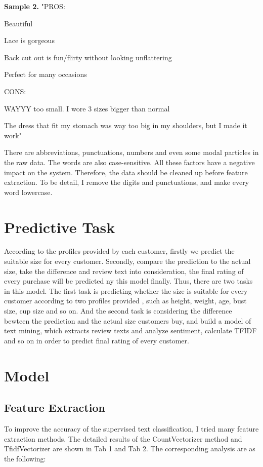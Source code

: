 \documentclass[letterpaper, 10 pt, conference]{ieeeconf}  %
\begin{document}
\textbf{Sample 2.} "PROS: 

Beautiful

Lace is gorgeous

Back cut out is fun/flirty without looking unflattering

Perfect for many occasions


CONS: 

WAYYY too small. I wore 3 sizes bigger than normal

The dress that fit my stomach was way too big in my shoulders, but I made it work"



There are abbreviations, punctuations, numbers and even some modal particles in the raw data. The words are also case-sensitive. All these factors have a negative impact on the system. Therefore, the data should be cleaned up before feature extraction. To be detail, I remove the digits and punctuations, and make every word lowercase.



\section{Predictive Task}
According to the profiles provided by each customer, firstly we predict the suitable size for every customer. Secondly, compare the prediction to the actual size, take the difference and review text into consideration, the final rating of every purchase will be predicted ny this model finally.
Thus, there are two tasks in this model. The first task is predicting whether the size is suitable for every customer according to two profiles provided , such as height, weight, age, bust size, cup size and so on. And the second task is considering the difference bewteen the prediction and the actual size customers buy,
 and build a model of text mining, which extracts review texts and analyze sentiment, calculate TFIDF and so on in order to predict final rating of every customer.


\section{Model}
\subsection{Feature Extraction}
To improve the accuracy of the supervised text classification, I tried many feature extraction methods. The detailed results of the CountVectorizer method and TfidfVectorizer are shown in Tab 1 and Tab 2. The corresponding analysis are as the following:
\end{document}

